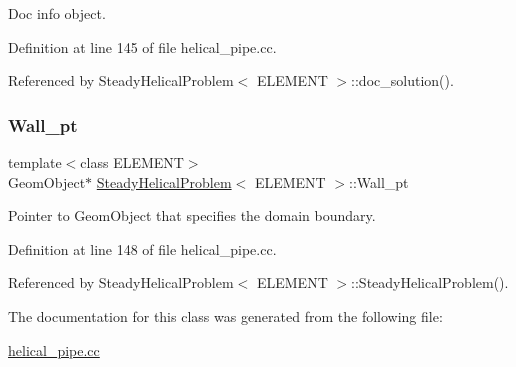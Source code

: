 Doc info object. 



Definition at line 145 of file helical\+\_\+pipe.\+cc.



Referenced by Steady\+Helical\+Problem$<$ E\+L\+E\+M\+E\+N\+T $>$\+::doc\+\_\+solution().

\mbox{\label{classSteadyHelicalProblem_a3ac6dc4f62f8ecadd4d6016b55af249a}} 
\subsubsection{\texorpdfstring{Wall\+\_\+pt}{Wall\_pt}}
{\footnotesize\ttfamily template$<$class E\+L\+E\+M\+E\+NT$>$ \\
Geom\+Object$\ast$ \hyperlink{classSteadyHelicalProblem}{Steady\+Helical\+Problem}$<$ E\+L\+E\+M\+E\+NT $>$\+::Wall\+\_\+pt\hspace{0.3cm}{\ttfamily [private]}}



Pointer to Geom\+Object that specifies the domain boundary. 



Definition at line 148 of file helical\+\_\+pipe.\+cc.



Referenced by Steady\+Helical\+Problem$<$ E\+L\+E\+M\+E\+N\+T $>$\+::\+Steady\+Helical\+Problem().



The documentation for this class was generated from the following file\+:\begin{DoxyCompactItemize}
\item 
\hyperlink{helical__pipe_8cc}{helical\+\_\+pipe.\+cc}\end{DoxyCompactItemize}
